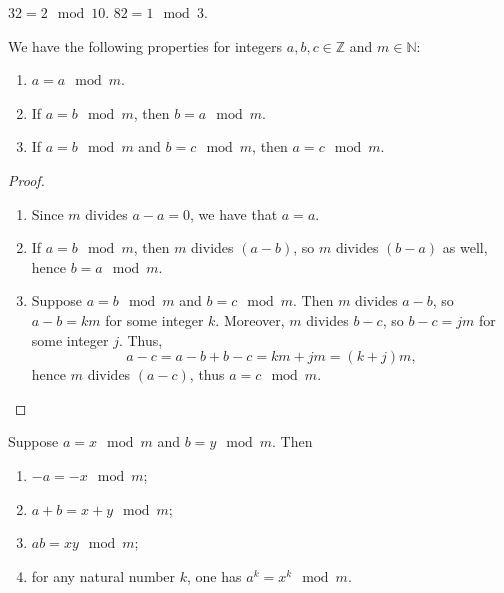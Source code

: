 \documentclass[11pt,dvipsnames]{book}
\numberwithin{equation}{section} %
\numberwithin{figure}{section} %
\numberwithin{table}{section} %
\begin{document}
\begin{example}
$32=2\mod 10$. $82=1 \mod 3$. 
\end{example}
 
\begin{theorem}
We have the following properties for integers $a,b,c\in\mathbb{Z}$ and $m\in\mathbb{N}$:
\begin{enumerate}[label=(\alph*)]
\item $a = a\mod m$. 
\item If $a = b\mod m$, then $b = a\mod m$. 
\item If $a = b\mod m$ and $b = c\mod m$, then $a = c\mod m$. 
\end{enumerate}
\end{theorem}

\begin{proof}
\begin{enumerate}[label=(\alph*)]
\item Since $m$ divides $a-a=0$, we have that $a = a$.
\item If $a = b\mod m$, then $m$ divides $(a-b)$, so $m$ divides $(b-a)$ as well, hence $b = a \mod m$. 
\item Suppose $a = b \mod m$ and $b = c\mod m$. Then $m$ divides $a-b$, so $a-b=km$ for some integer $k$. Moreover, $m$ divides $b-c$, so $b-c=jm$ for some integer $j$. Thus,
\[
a-c = a-b+b-c = km+jm = (k+j)m,\]
hence $m$ divides $(a-c)$, thus $a = c \mod m$.\qedhere
\end{enumerate}
\end{proof}

\begin{theorem}%
\label{t:mod-artithmetic}
Suppose $a  = x \mod m$ and $b = y \mod m$. Then
\begin{enumerate}[label=(\alph*)]
\item $-a = -x \mod m$;
\item $a+b = x+y \mod m$;
\item $ab  = xy \mod m$;
\item for any natural number $k$, one has $a^{k} = x^{k} \mod m$.
\end{enumerate}
\end{theorem}
\end{document}
